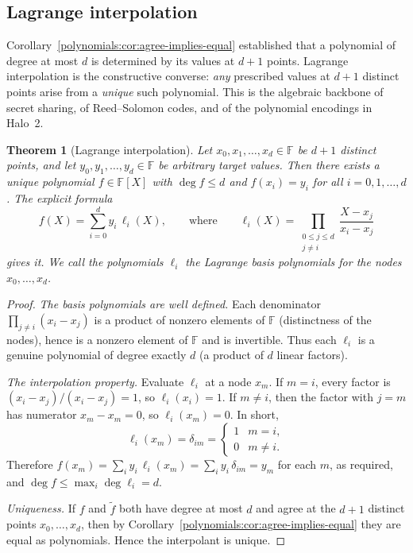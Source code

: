 \documentclass[11pt,a4paper]{article}
\newtheorem{theorem}{Theorem}[section]
\theoremstyle{definition}
\theoremstyle{remark}
\newcommand{\F}{\ensuremath{\mathbb{F}}}
\begin{document}
\subsection{Lagrange interpolation}
\label{polynomials:subsec:lagrange}

Corollary~\ref{polynomials:cor:agree-implies-equal} established that a polynomial of
degree at most \(d\) is determined by its values at \(d + 1\) points. Lagrange
interpolation is the constructive converse: \emph{any} prescribed values at
\(d + 1\) distinct points arise from a \emph{unique} such polynomial. This
is the algebraic backbone of secret sharing, of Reed--Solomon codes, and of the
polynomial encodings in Halo~2.

\begin{theorem}[Lagrange interpolation]\label{polynomials:thm:lagrange}
Let \(x_0, x_1, \dots, x_d \in \F\) be \(d + 1\) distinct points, and let
\(y_0, y_1, \dots, y_d \in \F\) be arbitrary target values. Then there exists a
\emph{unique} polynomial \(f \in \F[X]\) with \(\deg f \le d\) and
\(f(x_i) = y_i\) for all \(i = 0, 1, \dots, d\). The explicit
formula
\begin{equation}\label{polynomials:eq:lagrange}
  f(X) = \sum_{i=0}^{d} y_i\, \ell_i(X),
  \qquad\text{where}\qquad
  \ell_i(X) = \prod_{\substack{0 \le j \le d \\ j \neq i}}
              \frac{X - x_j}{x_i - x_j}
\end{equation}
gives it. We call the polynomials \(\ell_i\) the \emph{Lagrange basis polynomials} for
the nodes \(x_0, \dots, x_d\).
\end{theorem}

\begin{proof}
\emph{The basis polynomials are well defined.} Each denominator
\(\prod_{j \neq i}(x_i - x_j)\) is a product of nonzero elements of \(\F\)
(distinctness of the nodes), hence is a nonzero element of \(\F\) and is
invertible. Thus each \(\ell_i\) is a genuine polynomial of degree exactly
\(d\) (a product of \(d\) linear factors).

\emph{The interpolation property.} Evaluate \(\ell_i\) at a node \(x_m\). If
\(m = i\), every factor is \((x_i - x_j)/(x_i - x_j) = 1\), so \(\ell_i(x_i) =
1\). If \(m \neq i\), then the factor with \(j = m\) has numerator
\(x_m - x_m = 0\), so \(\ell_i(x_m) = 0\). In short,
\begin{equation}\label{polynomials:eq:lagrange-delta}
  \ell_i(x_m) = \delta_{im} =
  \begin{cases}
    1 & m = i,\\
    0 & m \neq i.
  \end{cases}
\end{equation}
Therefore
\(f(x_m) = \sum_{i} y_i\, \ell_i(x_m) = \sum_i y_i\, \delta_{im} = y_m\) for
each \(m\), as required, and \(\deg f \le \max_i \deg \ell_i = d\).

\emph{Uniqueness.} If \(f\) and \(\tilde f\) both have degree at most \(d\) and
agree at the \(d + 1\) distinct points \(x_0, \dots, x_d\), then by
Corollary~\ref{polynomials:cor:agree-implies-equal} they are equal as
polynomials. Hence the interpolant is unique.
\end{proof}
\end{document}
